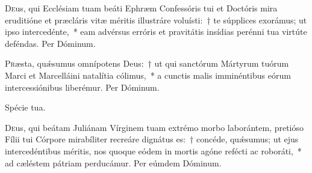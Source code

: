 \documentclass[vesperale_romanum.tex]{subfiles}
\begin{document}
\myrule


\duplex

\odoctoroptime

\oratio

\lettrine{D}{e}us, qui Ecclésiam tuam beáti Ephræm Confessóris tui et Doctóris mira eruditióne et præcláris vitæ méritis illustráre voluísti:~† te súpplices exorámus; ut i\-pso intercedénte,~* eam advérsus erróris et pravitátis insídias perénni tua virtúte deféndas.
Per Dóminum.


\oratio

\lettrine{P}{r}æsta, quǽsumus omnípotens Deus:~† ut qui san\-ctórum Mártyrum tuórum Marci et Marcelláini natalítia cólimus,~* a cun\-ctis malis imminéntibus eórum intercessiónibus liberémur. Per Dóminum.


\myrule


\duplex


\hymnus


\vv Spécie tua.


\oratio

\lettrine{D}{e}us, qui beátam Juliánam Vírginem tuam extrémo morbo laborántem, pretióso Fílii tui Córpore mirabíliter recreáre dignátus es:~† concéde, quǽsumus; ut ejus intercedéntibus méritis, nos quoque eódem in mortis agóne refé\-cti ac roboráti,~* ad cæléstem pátriam perducámur. Per eúmdem Dóminum.


\end{document}
